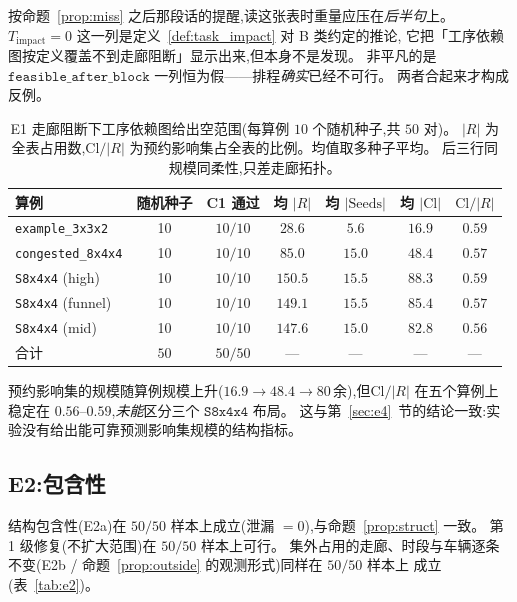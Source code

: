 \documentclass[manuscript,screen,review]{acmart}
\newcommand{\NSeeds}{10}
\newcommand{\NPairs}{50}
\newcommand{\PassMiss}{\NPairs/\NPairs}      %
\newcommand{\PassClosed}{\NPairs/\NPairs}    %
\newcommand{\PassInvar}{\NPairs/\NPairs}     %
\begin{document}
按命题~\ref{prop:miss} 之后那段话的提醒,读这张表时重量应压在\emph{后半句}上。
\(T_{\mathrm{impact}}=0\) 这一列是定义~\ref{def:task_impact} 对 B 类约定的推论,
它把「工序依赖图按定义覆盖不到走廊阻断」显示出来,但本身不是发现。
非平凡的是\(\texttt{feasible\_after\_block}\) 一列恒为假——排程\emph{确实}已经不可行。
两者合起来才构成反例。

\begin{table}[t]
\centering
\caption{E1 走廊阻断下工序依赖图给出空范围(每算例 \(\NSeeds\) 个随机种子,共 \(\NPairs\) 对)。
\(|R|\) 为全表占用数,\(\mathrm{Cl}/|R|\) 为预约影响集占全表的比例。均值取多种子平均。
后三行同规模同柔性,只差走廊拓扑。}
\label{tab:e1}
\small
\begin{tabular}{@{}lcccccc@{}}
\toprule
算例 & 随机种子 & C1 通过 & 均 \(|R|\) & 均 \(|\mathrm{Seeds}|\)
 & 均 \(|\mathrm{Cl}|\) & \(\mathrm{Cl}/|R|\) \\
\midrule
\texttt{example\_3x3x2}   & 10 & \(10/10\) & \(28.6\)  & \(5.6\)  & \(16.9\) & \(0.59\) \\
\texttt{congested\_8x4x4} & 10 & \(10/10\) & \(85.0\)  & \(15.0\) & \(48.4\) & \(0.57\) \\
\texttt{S8x4x4} (high)    & 10 & \(10/10\) & \(150.5\) & \(15.5\) & \(88.3\) & \(0.59\) \\
\texttt{S8x4x4} (funnel)  & 10 & \(10/10\) & \(149.1\) & \(15.5\) & \(85.4\) & \(0.57\) \\
\texttt{S8x4x4} (mid)     & 10 & \(10/10\) & \(147.6\) & \(15.0\) & \(82.8\) & \(0.56\) \\
\midrule
合计 & \(\NPairs\) & \(\PassMiss\) & --- & --- & --- & --- \\
\bottomrule
\end{tabular}
\end{table}

预约影响集的规模随算例规模上升(\(16.9\to 48.4\to 80\)\,余),但\(\mathrm{Cl}/|R|\) 在五个算例上
稳定在 \(0.56\)--\(0.59\),\emph{未能}区分三个 \(\texttt{S8x4x4}\) 布局。
这与第~\ref{sec:e4}~节的结论一致:实验没有给出能可靠预测影响集规模的结构指标。

\subsection{E2:包含性}
\label{sec:e2}

结构包含性(E2a)在 \(\PassClosed\) 样本上成立(泄漏 \(=0\)),与命题~\ref{prop:struct} 一致。
第 1 级修复(不扩大范围)在 \(\NPairs/\NPairs\) 样本上可行。
集外占用的走廊、时段与车辆逐条不变(E2b / 命题~\ref{prop:outside} 的观测形式)同样在 \(\PassInvar\) 样本上
成立(表~\ref{tab:e2})。
\end{document}
